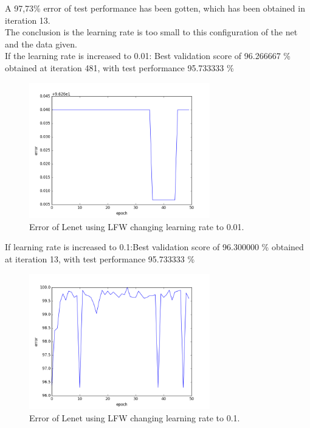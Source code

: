 A 97,73\% error of test performance has been gotten, which has been obtained in iteration 13. \\

The conclusion is the learning rate is too small to this configuration of the net and the data given.\\

If the learning rate is increased to 0.01: Best validation score of 96.266667 \% obtained at iteration 481, with test performance 95.733333 \%\\

\begin{figure}[htb]
\centering
\includegraphics[width=0.7\textwidth]{images/LFW_learningrate/error_0_01.png}
\caption{Error of Lenet using LFW changing learning rate to 0.01.} \label{fig:LENETLFW_lr0_01}
\end{figure}

If learning rate is increased to 0.1:Best validation score of 96.300000 \% obtained at iteration 13, with test performance 95.733333 \%\\

\begin{figure}[htb]
\centering
\includegraphics[width=0.7\textwidth]{images/LFW_learningrate/error_0_1.png}
\caption{Error of Lenet using LFW changing learning rate to 0.1.} \label{fig:LENETLFW_lr0_1}
\end{figure}


